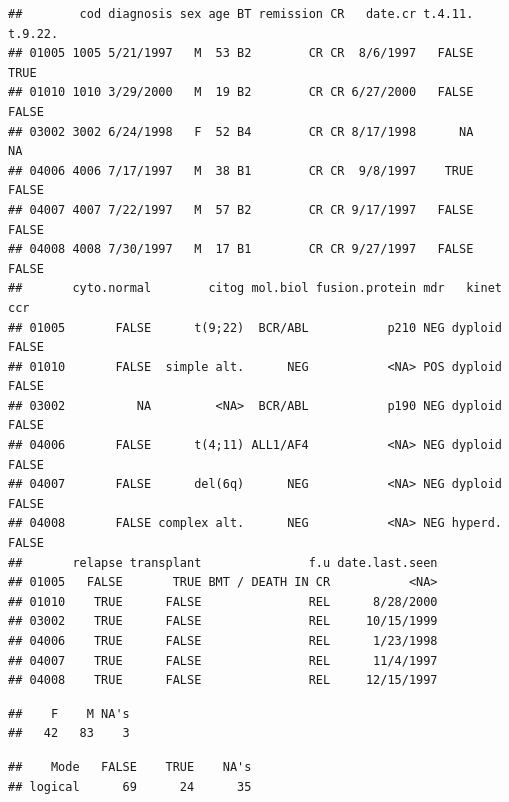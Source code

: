 \documentclass[]{article}
\newenvironment{Shaded}{\begin{snugshade}}{\end{snugshade}}
\newcommand{\KeywordTok}[1]{\textcolor[rgb]{0.13,0.29,0.53}{\textbf{#1}}}
\newcommand{\OperatorTok}[1]{\textcolor[rgb]{0.81,0.36,0.00}{\textbf{#1}}}
\newcommand{\NormalTok}[1]{#1}
\theoremstyle{definition}
\theoremstyle{definition}
\theoremstyle{remark}
\begin{document}
\begin{verbatim}
##        cod diagnosis sex age BT remission CR   date.cr t.4.11. t.9.22.
## 01005 1005 5/21/1997   M  53 B2        CR CR  8/6/1997   FALSE    TRUE
## 01010 1010 3/29/2000   M  19 B2        CR CR 6/27/2000   FALSE   FALSE
## 03002 3002 6/24/1998   F  52 B4        CR CR 8/17/1998      NA      NA
## 04006 4006 7/17/1997   M  38 B1        CR CR  9/8/1997    TRUE   FALSE
## 04007 4007 7/22/1997   M  57 B2        CR CR 9/17/1997   FALSE   FALSE
## 04008 4008 7/30/1997   M  17 B1        CR CR 9/27/1997   FALSE   FALSE
##       cyto.normal        citog mol.biol fusion.protein mdr   kinet   ccr
## 01005       FALSE      t(9;22)  BCR/ABL           p210 NEG dyploid FALSE
## 01010       FALSE  simple alt.      NEG           <NA> POS dyploid FALSE
## 03002          NA         <NA>  BCR/ABL           p190 NEG dyploid FALSE
## 04006       FALSE      t(4;11) ALL1/AF4           <NA> NEG dyploid FALSE
## 04007       FALSE      del(6q)      NEG           <NA> NEG dyploid FALSE
## 04008       FALSE complex alt.      NEG           <NA> NEG hyperd. FALSE
##       relapse transplant               f.u date.last.seen
## 01005   FALSE       TRUE BMT / DEATH IN CR           <NA>
## 01010    TRUE      FALSE               REL      8/28/2000
## 03002    TRUE      FALSE               REL     10/15/1999
## 04006    TRUE      FALSE               REL      1/23/1998
## 04007    TRUE      FALSE               REL      11/4/1997
## 04008    TRUE      FALSE               REL     12/15/1997
\end{verbatim}

\begin{Shaded}
\end{Shaded}

\begin{verbatim}
##    F    M NA's 
##   42   83    3
\end{verbatim}

\begin{Shaded}
\end{Shaded}

\begin{verbatim}
##    Mode   FALSE    TRUE    NA's 
## logical      69      24      35
\end{verbatim}
\end{document}
